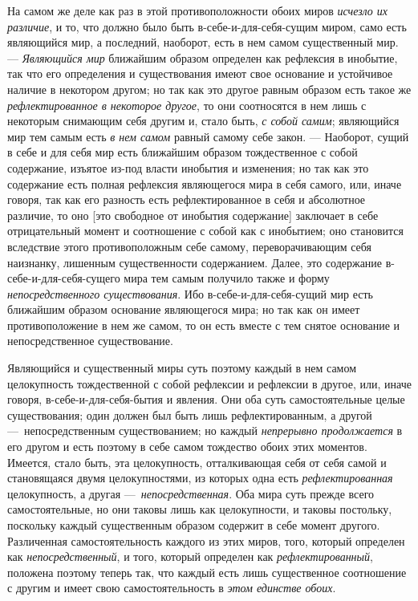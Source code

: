 На самом же деле как раз в этой противоположности обоих миров
{\em исчезло их различие}, и то, что должно было быть
в-себе-и-для-себя-сущим миром, само есть являющийся мир, а последний,
наоборот, есть в нем самом существенный мир. —
{\em Являющийся мир} ближайшим образом определен как
рефлексия в инобытие, так что его определения и существования имеют свое
основание и устойчивое наличие в некотором другом; но так как это другое
равным образом есть такое же {\em рефлектированное в
некоторое другое}, то они соотносятся в нем лишь с некоторым снимающим себя
другим и, стало быть, {\em с собой самим}; являющийся
мир тем самым есть {\em в нем самом} равный самому себе
закон. — Наоборот, сущий в себе и для себя мир есть ближайшим образом
тождественное с собой содержание, изъятое из-под власти инобытия и
изменения; но так как это содержание есть полная рефлексия являющегося мира
в себя самого, или, иначе говоря, так как его разность есть
рефлектированное в себя и абсолютное различие, то оно [это свободное от
инобытия содержание] заключает в себе отрицательный момент и соотношение с
собой как с инобытием; оно становится вследствие этого противоположным себе
самому, переворачивающим себя наизнанку, лишенным существенности
содержанием. Далее, это содержание в-себе-и-для-себя-сущего мира тем самым
получило также и форму {\em непосредственного
существования}. Ибо в-себе-и-для-себя-сущий мир есть ближайшим образом
основание являющегося мира; но так как он имеет противоположение в нем же
самом, то он есть вместе с тем снятое основание и непосредственное
существование.

Являющийся и существенный миры суть поэтому каждый в нем самом целокупность
тождественной с собой рефлексии и рефлексии в другое, или, иначе говоря,
в-себе-и-для-себя-бытия и явления. Они оба суть самостоятельные целые
существования; один должен был быть лишь рефлектированным, а другой
—~непосредственным существованием; но каждый
{\em непрерывно продолжается} в его другом и есть
поэтому в себе самом тождество обоих этих моментов. Имеется, стало быть,
эта целокупность, отталкивающая себя от себя самой и становящаяся двумя
целокупностями, из которых одна есть
{\em рефлектированная} целокупность, а другая
—~{\em непосредственная}. Оба мира суть прежде всего
самостоятельные, но они таковы лишь как целокупности, и таковы постольку,
поскольку каждый существенным образом содержит в себе момент другого.
Различенная самостоятельность каждого из этих миров, того, который
определен как {\em непосредственный}, и того, который
определен как {\em рефлектированный}, положена поэтому
теперь так, что каждый есть лишь существенное соотношение с другим и имеет
свою самостоятельность в {\em этом единстве обоих}.

